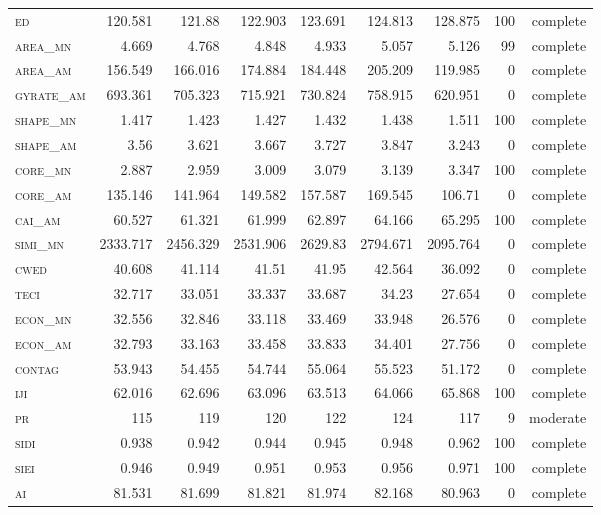 \begin{landscape}
\begin{table}[]
\begin{tabular}{@{}lrrrrr|rrr@{}}
\textsc{ed        } & 120.581  & 121.88   & 122.903  & 123.691  & 124.813  & 128.875  & 100 & complete  \\
\textsc{area\_mn  } & 4.669    & 4.768    & 4.848    & 4.933    & 5.057    & 5.126    & 99  & complete   \\
\textsc{area\_am  } & 156.549  & 166.016  & 174.884  & 184.448  & 205.209  & 119.985  & 0   & complete \\
\textsc{gyrate\_am} & 693.361  & 705.323  & 715.921  & 730.824  & 758.915  & 620.951  & 0   & complete \\
\textsc{shape\_mn } & 1.417    & 1.423    & 1.427    & 1.432    & 1.438    & 1.511    & 100 & complete  \\
\textsc{shape\_am } & 3.56     & 3.621    & 3.667    & 3.727    & 3.847    & 3.243    & 0   & complete \\
\textsc{core\_mn  } & 2.887    & 2.959    & 3.009    & 3.079    & 3.139    & 3.347    & 100 & complete  \\
\textsc{core\_am  } & 135.146  & 141.964  & 149.582  & 157.587  & 169.545  & 106.71   & 0   & complete \\
\textsc{cai\_am   } & 60.527   & 61.321   & 61.999   & 62.897   & 64.166   & 65.295   & 100 & complete  \\
\textsc{simi\_mn  } & 2333.717 & 2456.329 & 2531.906 & 2629.83  & 2794.671 & 2095.764 & 0   & complete \\
\textsc{cwed      } & 40.608   & 41.114   & 41.51    & 41.95    & 42.564   & 36.092   & 0   & complete \\
\textsc{teci      } & 32.717   & 33.051   & 33.337   & 33.687   & 34.23    & 27.654   & 0   & complete \\
\textsc{econ\_mn  } & 32.556   & 32.846   & 33.118   & 33.469   & 33.948   & 26.576   & 0   & complete \\
\textsc{econ\_am  } & 32.793   & 33.163   & 33.458   & 33.833   & 34.401   & 27.756   & 0   & complete \\
\textsc{contag    } & 53.943   & 54.455   & 54.744   & 55.064   & 55.523   & 51.172   & 0   & complete \\
\textsc{iji       } & 62.016   & 62.696   & 63.096   & 63.513   & 64.066   & 65.868   & 100 & complete  \\
\textsc{pr        } & 115      & 119      & 120      & 122      & 124      & 117      & 9   & moderate  \\
\textsc{sidi      } & 0.938    & 0.942    & 0.944    & 0.945    & 0.948    & 0.962    & 100 & complete  \\
\textsc{siei      } & 0.946    & 0.949    & 0.951    & 0.953    & 0.956    & 0.971    & 100 & complete  \\
\textsc{ai        } & 81.531   & 81.699   & 81.821   & 81.974   & 82.168   & 80.963   & 0   & complete \\ \bottomrule
\end{tabular}
\end{table}
\end{landscape}